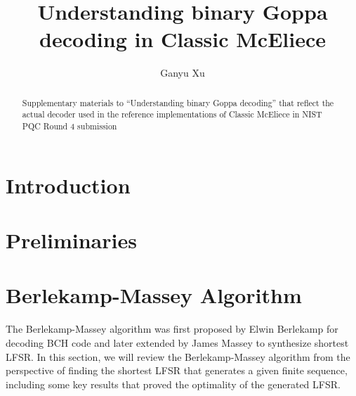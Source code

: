\documentclass[runningheads]{llncs}
\begin{document}
\title{Understanding binary Goppa decoding in Classic McEliece}


\author{
    Ganyu Xu
}
%


\maketitle 

\begin{abstract}
    Supplementary materials to ``Understanding binary Goppa decoding'' that reflect the actual decoder used in the reference implementations of Classic McEliece in NIST PQC Round 4 submission

\end{abstract}

\section{Introduction}

\section{Preliminaries}

\section{Berlekamp-Massey Algorithm}\label{sec:berlekamp-massey-algorithm}
The Berlekamp-Massey algorithm was first proposed by Elwin Berlekamp \cite{DBLP:journals/tit/Berlekamp68} for decoding BCH code and later extended by James Massey \cite{DBLP:journals/tit/Massey69} to synthesize shortest LFSR. In this section, we will review the Berlekamp-Massey algorithm from the perspective of finding the shortest LFSR that generates a given finite sequence, including some key results that proved the optimality of the generated LFSR.
\end{document}
